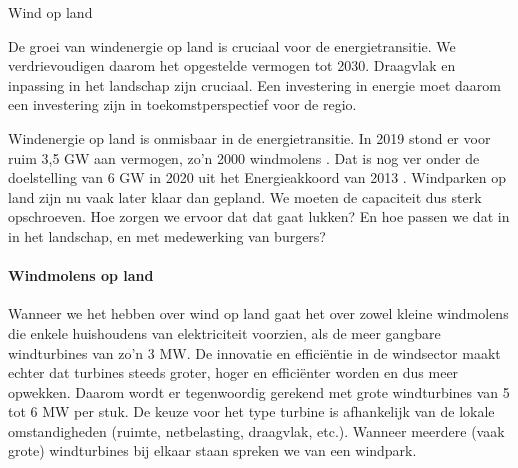\begin{voorstel}{Wind op land}


\begin{samenvatting}
De groei van windenergie op land is cruciaal voor de energietransitie. We verdrievoudigen daarom het opgestelde vermogen tot 2030. Draagvlak en inpassing in het landschap zijn cruciaal. Een investering in energie moet daarom een investering zijn in toekomstperspectief voor de regio.
\end{samenvatting}

\begin{multicols}{2}

\begin{uitdaging}
Windenergie op land is onmisbaar in de energietransitie. In 2019 stond er voor ruim 3,5 GW aan vermogen, zo’n 2000 windmolens \parencite{cbs_statline_nodate}. Dat is nog ver onder de doelstelling van 6 GW in 2020 uit het Energieakkoord van 2013 \parencite{rijksoverheid_windenergie_2016}. Windparken op land zijn nu vaak later klaar dan gepland. We moeten de capaciteit dus sterk opschroeven. Hoe zorgen we ervoor dat dat gaat lukken? En hoe passen we dat in in het landschap, en met medewerking van burgers?
\end{uitdaging}

\begin{overwegingen}
\paragraph{Windmolens op land}
Wanneer we het hebben over wind op land gaat het over zowel kleine windmolens die enkele huishoudens van elektriciteit voorzien, als de meer gangbare windturbines van zo'n 3 MW. De innovatie en efficiëntie in de windsector maakt echter dat turbines steeds groter, hoger en efficiënter worden en dus meer opwekken. Daarom wordt er tegenwoordig gerekend met grote windturbines van 5 tot 6 MW per stuk. De keuze voor het type turbine is afhankelijk van de lokale omstandigheden (ruimte, netbelasting, draagvlak, etc.). Wanneer meerdere (vaak grote) windturbines bij elkaar staan spreken we van een windpark.


\end{overwegingen}
\end{multicols}
\end{voorstel}
